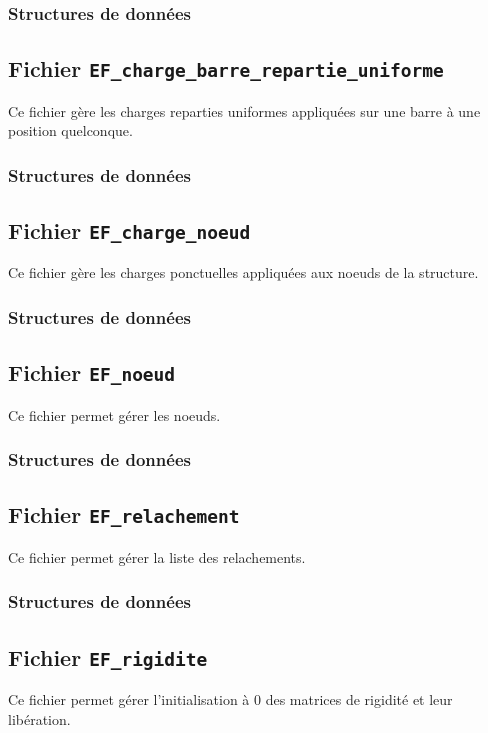 \documentclass{article}
\begin{document}
\subsubsection{Structures de données}


\subsection{Fichier {\texttt{EF\_charge\_barre\_repartie\_uniforme}}}
Ce fichier gère les charges reparties uniformes appliquées sur une barre à une position quelconque.
\subsubsection{Structures de données}


\subsection{Fichier {\texttt{EF\_charge\_noeud}}}
Ce fichier gère les charges ponctuelles appliquées aux noeuds de la structure.
\subsubsection{Structures de données}


\subsection{Fichier {\texttt{EF\_noeud}}}
Ce fichier permet gérer les noeuds.
\subsubsection{Structures de données}


\subsection{Fichier {\texttt{EF\_relachement}}}
Ce fichier permet gérer la liste des relachements.
\subsubsection{Structures de données}


\subsection{Fichier {\texttt{EF\_rigidite}}}
Ce fichier permet gérer l'initialisation à 0 des matrices de rigidité et leur libération.
\end{document}
